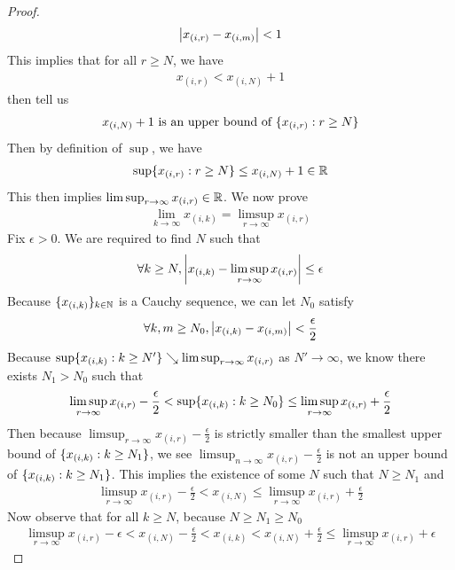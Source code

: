 \documentclass{report}
\begin{document}
\begin{proof}
 \begin{align*}
\left|x_{(i,r)}-x_{(i,m)}\right|<1
\end{align*}
This implies that for all $r\geq N$, we have 
\begin{align}
x_{(i,r)}< x_{(i,N)}+1 \label{ran1}
\end{align}
 then tell us 
\begin{align*}
x_{(i,N)}+1\text{ is an upper bound of }\{ x_{(i,r)}:r\geq N \}
\end{align*}
Then by definition of $\sup $, we have
\begin{align*}
\sup \{ x_{(i,r)}:r\geq N \} \leq x_{(i,N)}+1 \in\mathbb{R}
\end{align*}
This then implies $\limsup_{r\to\infty} x_{(i,r)}\in\mathbb{R}$. We now prove 
\begin{align}
\label{ran2}
\lim_{k\to \infty}x_{(i,k)}= \limsup_{r\to\infty} x_{(i,r)}
\end{align}
Fix $\epsilon >0$. We are required to find $N$ such that
\begin{align*}
\forall k\geq N, \left|x_{(i,k)}-\limsup_{r\to\infty}x_{(i,r)}\right| \leq \epsilon 
\end{align*}
Because $\{ x_{(i,k)} \}_{k\in\mathbb{N}}$ is a Cauchy sequence, we can let $N_0$ satisfy 
\begin{align*}
\forall k,m\geq N_0, \left|x_{(i,k)}-x_{(i,m)}\right|<\frac{\epsilon}{2}
\end{align*}
Because $\sup \{ x_{(i,k)}:k\geq N' \}\searrow \limsup_{r\to\infty} x_{(i,r)}$ as $N'\to \infty$, we know there exists $N_1>N_0$ such that 
 \begin{align*}
\limsup_{r\to\infty} x_{(i,r)}-\frac{\epsilon}{2} <\sup \{ x_{(i,k)}:k\geq N_0 \}\leq \limsup_{r\to\infty}  x_{(i,r)} + \frac{\epsilon}{2} 
\end{align*}
Then because $\limsup_{r\to\infty} x_{(i,r)}-\frac{\epsilon}{2}$ is strictly smaller than the smallest upper bound of $\{ x_{(i,k)}:k\geq N_1 \}$, we see $\limsup_{n\to\infty} x_{(i,r)}-\frac{\epsilon}{2}$ is not an upper bound of $\{ x_{(i,k)}:k\geq N_1 \}$. This implies the existence of some $N$ such that  $N\geq N_1$ and
\begin{align*}
\limsup_{r\to\infty} x_{(i,r)}-\frac{\epsilon}{2}< x_{(i,N)}\leq \limsup_{r\to\infty}x_{(i,r)} + \frac{\epsilon}{2}
\end{align*}
Now observe that for all $k\geq N$, because $N\geq N_1\geq N_0$ 
\begin{align*}
  \limsup_{r\to\infty} x_{(i,r)} - \epsilon <x_{(i,N)}-\frac{\epsilon}{2}<x_{(i,k)}< x_{(i,N)}+\frac{\epsilon}{2} \leq \limsup_{r\to\infty} x_{(i,r)} + \epsilon   

\end{align*}
\end{proof}
\end{document}
